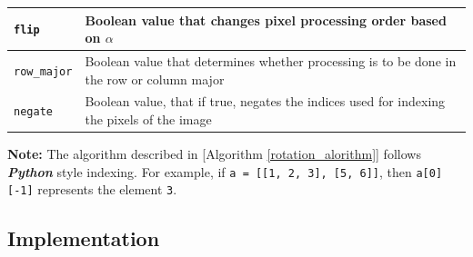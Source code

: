 \documentclass[conference]{IEEEtran}
\begin{document}
\begin{table}[t]
\begin{threeparttable}
\begin{tabular}{|m{1.5cm}|m{6cm}|}
            \verb|flip|      & Boolean value that changes pixel processing order based on $\alpha$                                                                         \\ \hline
            \verb|row_major| & Boolean value that determines whether processing is to be done in the row or column major                                                   \\ \hline
            \verb|negate|    & Boolean value, that if true, negates the indices used for indexing the pixels of the image                                                  \\ \hline
        \end{tabular}
        \begin{tablenotes}
            \small
            \item \textbf{Note:} The algorithm described in [Algorithm \ref{rotation_alorithm}] follows \textbf{\textit{Python}} style indexing. For example, if \verb|a = [[1, 2, 3], [5, 6]]|, then \verb|a[0][-1]| represents the element \verb|3|.
        \end{tablenotes}
    \end{threeparttable}
\end{table}


\subsection{Implementation}
\end{document}

